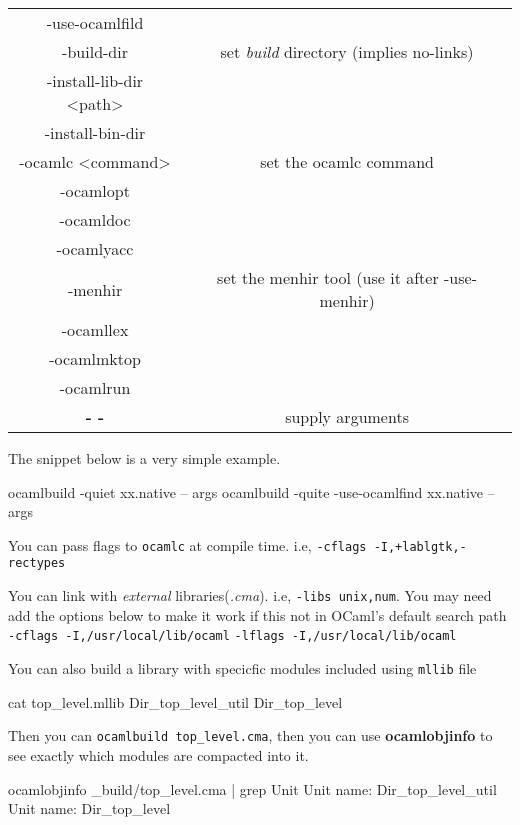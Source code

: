 \begin{longtable}{|c|c|}
-use-ocamlfild & \\
-build-dir & set \textit{build} directory (implies no-links)\\
-install-lib-dir <path> & \\
-install-bin-dir & \\
-ocamlc <command> & set the ocamlc command \\
-ocamlopt  & \\
-ocamldoc & \\
-ocamlyacc & \\
-menhir & set the menhir tool (use it after -use-menhir)\\
-ocamllex & \\
-ocamlmktop & \\
-ocamlrun & \\
\textbf{- -}  & supply arguments \\
\hline
\end{longtable}

The snippet below is a very simple example.

\begin{bashcode}
ocamlbuild -quiet xx.native -- args
ocamlbuild -quite -use-ocamlfind xx.native -- args
\end{bashcode}


You can pass flags to \verb|ocamlc| at compile time. i.e,
\verb|-cflags -I,+lablgtk,-rectypes|

You can link with \textit{ external} libraries(\textit{.cma}). i.e,
\verb|-libs unix,num|.  You may need add the options below to make it
work if this not in OCaml's default search path
\verb|-cflags -I,/usr/local/lib/ocaml|
\verb|-lflags -I,/usr/local/lib/ocaml|


You can also build a library with specicfic modules included using
\verb|mllib| file

\begin{bashcode}
cat top_level.mllib    
Dir_top_level_util
Dir_top_level  
\end{bashcode}

Then you can \verb|ocamlbuild top_level.cma|, then you can use
\textbf{ocamlobjinfo} to see exactly which modules are compacted into
it.

\begin{bashcode}
ocamlobjinfo _build/top_level.cma | grep Unit  
Unit name: Dir_top_level_util
Unit name: Dir_top_level
\end{bashcode}

